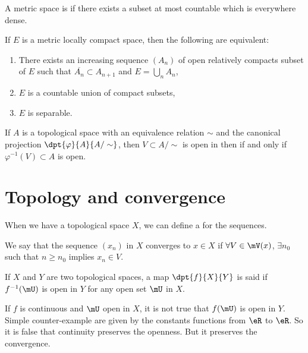 \begin{definition}
A metric space is  if there exists a subset at most countable which is everywhere dense.
\end{definition}

\begin{proposition}
If $E$ is a metric locally compact space, then the following are equivalent:
\begin{enumerate}
\item There exists an increasing sequence $(A_n)$ of open relatively compacts subset of $E$ such that $\overline{A_n}\subset A_{n+1}$ and $E=\bigcup_n A_n$,

\item $E$ is a countable union of compact subsets,

\item $E$ is separable.
\end{enumerate}
\end{proposition}

If $A$ is a topological space with an equivalence relation $\sim$ and the canonical projection $\dpt{\varphi}{A}{A/\sim}$, then $V\subset A/\sim$ is open in then  if and only if $\varphi^{-1}(V)\subset A$ is open. 

\section{Topology and convergence}

When we have a topological space $X$, we can define a  for the sequences.

\begin{definition}
We say that the sequence $(x_n)$ in $X$ converges to $x\in X$ if
$\forall V\in\mV(x)$, $\exists n_0$ such that $n\geq n_0$ implies $x_n\in V$. \label{def:convergence}
\end{definition}

\begin{definition}
If $X$ and $Y$ are two topological spaces, a map $\dpt{f}{X}{Y}$ is said  if $f^{-1}(\mU)$ is open in $Y$ for any open set $\mU$ in $X$.
\end{definition}

If $f$ is continuous and $\mU$ open in $X$, it is not true that $f(\mU)$ is open in $Y$. Simple counter-example are given by the constants functions from $\eR$ to $\eR$. So it is false that continuity preserves the openness. But it preserves the convergence. 

